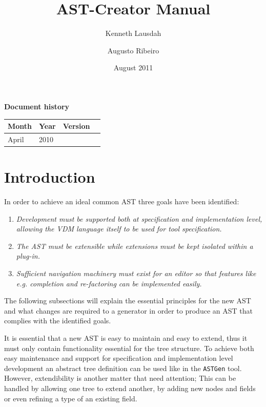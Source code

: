 \documentclass{overturerepchap}
\begin{document}
 
\title{AST-Creator Manual}
\author{ Kenneth Lausdah \and Augusto Ribeiro}

\date{August 2011}

\maketitle


{\textbf{Document history}}

\begin{tabular}{|l|l|l|l|}\hline
Month   & Year & Version \\ \hline
April   & 2010 &    \\ \hline
\end{tabular}

\tableofcontents
\newpage
\mbox{}
\newpage
{} 
\setcounter{page}{1}

\chapter{Introduction}
In order to achieve an ideal common AST three goals have been identified:
\begin{enumerate}
\item \textit{Development must be supported both at specification and implementation level, allowing the VDM language itself to be used for tool specification.}
\item \textit{The AST must be extensible while extensions must be kept isolated within a plug-in.}
\item \textit{Sufficient navigation machinery must exist for an editor so that features like e.g. completion and re-factoring can be implemented easily.}
\end{enumerate}
The following subsections will explain the essential principles for the new AST and what changes are required to a generator in order to produce an AST that complies with the identified goals.




It is essential that a new AST is easy to maintain and easy to extend, thus it must only contain functionality essential for the tree structure. To achieve both easy maintenance and support for specification and implementation level development an abstract tree definition can be used like in the \texttt{ASTGen} tool. However, extendibility is another matter that need attention; This can be handled by allowing one tree to extend another, by adding new nodes and fields or even refining a type of an existing field.
\end{document}

